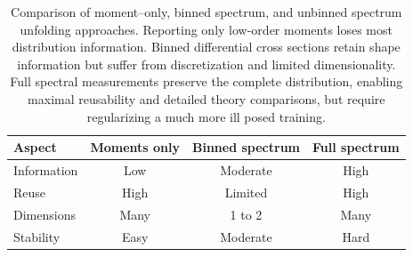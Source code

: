 \begin{table}
\centering
\caption[Comparison of moment--only, binned spectrum, and unbinned spectrum unfolding approaches.]{%
Comparison of  moment--only, binned spectrum, and unbinned spectrum unfolding approaches. Reporting only low-order moments loses most distribution information. Binned differential cross sections retain shape information but suffer from discretization and limited dimensionality. Full spectral measurements preserve the complete distribution, enabling maximal reusability and detailed theory comparisons, but require regularizing a much more ill posed training.}
\label{tab:meas_compare}
\begin{tabular}{lccc}
\toprule
\textbf{Aspect} & \textbf{Moments only} & \textbf{Binned spectrum} & \textbf{Full spectrum} \\
\midrule
Information & Low & Moderate & High \\
Reuse & High & Limited & High \\
Dimensions & Many & 1 to 2 & Many \\
Stability & Easy & Moderate & Hard \\
\bottomrule
\end{tabular}
\end{table}